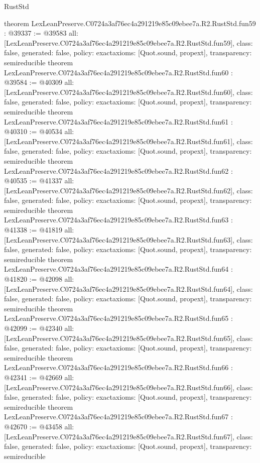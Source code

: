 \begin{lexlean}{RustStd}
\begin{coremodule}
{}
theorem LexLeanPreserve.C0724a3af76ec4a291219e85c09ebee7a.R2.RustStd.fun59 : @39337 := @39583 {
  all: [LexLeanPreserve.C0724a3af76ec4a291219e85c09ebee7a.R2.RustStd.fun59],
  class: false,
  generated: false,
  policy: exact{axioms: [Quot.sound, propext]},
  transparency: semireducible
}
theorem LexLeanPreserve.C0724a3af76ec4a291219e85c09ebee7a.R2.RustStd.fun60 : @39584 := @40309 {
  all: [LexLeanPreserve.C0724a3af76ec4a291219e85c09ebee7a.R2.RustStd.fun60],
  class: false,
  generated: false,
  policy: exact{axioms: [Quot.sound, propext]},
  transparency: semireducible
}
theorem LexLeanPreserve.C0724a3af76ec4a291219e85c09ebee7a.R2.RustStd.fun61 : @40310 := @40534 {
  all: [LexLeanPreserve.C0724a3af76ec4a291219e85c09ebee7a.R2.RustStd.fun61],
  class: false,
  generated: false,
  policy: exact{axioms: [Quot.sound, propext]},
  transparency: semireducible
}
theorem LexLeanPreserve.C0724a3af76ec4a291219e85c09ebee7a.R2.RustStd.fun62 : @40535 := @41337 {
  all: [LexLeanPreserve.C0724a3af76ec4a291219e85c09ebee7a.R2.RustStd.fun62],
  class: false,
  generated: false,
  policy: exact{axioms: [Quot.sound, propext]},
  transparency: semireducible
}
theorem LexLeanPreserve.C0724a3af76ec4a291219e85c09ebee7a.R2.RustStd.fun63 : @41338 := @41819 {
  all: [LexLeanPreserve.C0724a3af76ec4a291219e85c09ebee7a.R2.RustStd.fun63],
  class: false,
  generated: false,
  policy: exact{axioms: [Quot.sound, propext]},
  transparency: semireducible
}
theorem LexLeanPreserve.C0724a3af76ec4a291219e85c09ebee7a.R2.RustStd.fun64 : @41820 := @42098 {
  all: [LexLeanPreserve.C0724a3af76ec4a291219e85c09ebee7a.R2.RustStd.fun64],
  class: false,
  generated: false,
  policy: exact{axioms: [Quot.sound, propext]},
  transparency: semireducible
}
theorem LexLeanPreserve.C0724a3af76ec4a291219e85c09ebee7a.R2.RustStd.fun65 : @42099 := @42340 {
  all: [LexLeanPreserve.C0724a3af76ec4a291219e85c09ebee7a.R2.RustStd.fun65],
  class: false,
  generated: false,
  policy: exact{axioms: [Quot.sound, propext]},
  transparency: semireducible
}
theorem LexLeanPreserve.C0724a3af76ec4a291219e85c09ebee7a.R2.RustStd.fun66 : @42341 := @42669 {
  all: [LexLeanPreserve.C0724a3af76ec4a291219e85c09ebee7a.R2.RustStd.fun66],
  class: false,
  generated: false,
  policy: exact{axioms: [Quot.sound, propext]},
  transparency: semireducible
}
theorem LexLeanPreserve.C0724a3af76ec4a291219e85c09ebee7a.R2.RustStd.fun67 : @42670 := @43458 {
  all: [LexLeanPreserve.C0724a3af76ec4a291219e85c09ebee7a.R2.RustStd.fun67],
  class: false,
  generated: false,
  policy: exact{axioms: [Quot.sound, propext]},
  transparency: semireducible
}
\end{coremodule}
\end{lexlean}
